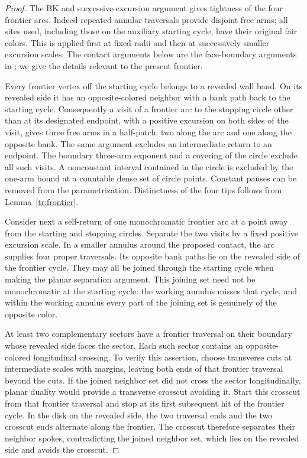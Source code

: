 \begin{proof}
The BK and successive-excursion argument gives tightness of the four
frontier arcs.  Indeed repeated annular traversals provide disjoint
free arms; all sites used, including those on the auxiliary starting
cycle, have their original fair colors.  This is applied first at
fixed radii and then at successively smaller excursion scales.
The contact arguments below are the face-boundary arguments in
\cite[Section~3]{V}; we give the details relevant to the present
frontier.

Every frontier vertex off the starting cycle belongs to a revealed
wall band.  On its revealed side it has an opposite-colored neighbor
with a bank path back to the starting cycle.  Consequently a visit of
a frontier arc to the stopping circle other than at its designated
endpoint, with a positive excursion on both sides of the visit, gives
three free arms in a half-patch: two along the arc and one along the
opposite bank.  The same argument excludes an intermediate return to
an endpoint.  The boundary three-arm exponent and a covering of the
circle exclude all such visits.  A nonconstant interval contained in
the circle is excluded by the one-arm bound at a countable dense set
of circle points.  Constant pauses can be removed from the
parametrization.  Distinctness of the four tips follows from
Lemma~\ref{tr:frontier}.

Consider next a self-return of one monochromatic frontier arc at a
point away from the starting and stopping circles.  Separate the two
visits by a fixed positive excursion scale.  In a smaller annulus
around the proposed contact, the arc supplies four proper traversals.
Its opposite bank paths lie on the revealed side of the frontier
cycle.  They may all be joined through the starting cycle when making
the planar separation argument.  This joining set need not be
monochromatic at the starting cycle: the working annulus misses that
cycle, and within the working annulus every part of the joining set
is genuinely of the opposite color.

At least two complementary sectors have a frontier traversal on their
boundary whose revealed side faces the sector.  Each such sector
contains an opposite-colored longitudinal crossing.  To verify this assertion,
choose transverse cuts at intermediate scales with margins, leaving
both ends of that frontier traversal beyond the cuts.  If the joined
neighbor set did not cross the sector longitudinally, planar duality
would provide a transverse crosscut avoiding it.  Start this crosscut
from that frontier traversal and stop at its first subsequent hit of the
frontier cycle.  In the disk on the revealed side, the two traversal ends
and the two crosscut ends alternate along the frontier.  The crosscut
therefore separates their neighbor spokes, contradicting the joined
neighbor set, which lies on the revealed side and avoids the
crosscut.


\end{proof}
